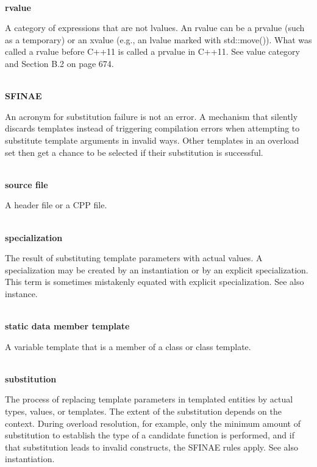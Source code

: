 \hspace*{\fill} \\ %
\noindent
\textbf{rvalue}

A category of expressions that are not lvalues. An rvalue can be a prvalue (such as a temporary) or an xvalue (e.g., an lvalue marked with std::move()). What was called a rvalue before C++11 is called a prvalue in C++11. See value category and Section B.2 on page 674.

\hspace*{\fill} \\ %
\noindent
\textbf{SFINAE}

An acronym for substitution failure is not an error. A mechanism that silently discards templates instead of triggering compilation errors when attempting to substitute template arguments in invalid ways. Other templates in an overload set then get a chance to be selected if their substitution is successful.

\hspace*{\fill} \\ %
\noindent
\textbf{source file}

A header file or a CPP file.

\hspace*{\fill} \\ %
\noindent
\textbf{specialization}

The result of substituting template parameters with actual values. A specialization may be created by an instantiation or by an explicit specialization. This term is sometimes mistakenly equated with explicit specialization. See also instance.

\hspace*{\fill} \\ %
\noindent
\textbf{static data member template}

A variable template that is a member of a class or class template.

\hspace*{\fill} \\ %
\noindent
\textbf{substitution}

The process of replacing template parameters in templated entities by actual types, values, or templates. The extent of the substitution depends on the context. During overload resolution, for example, only the minimum amount of substitution to establish the type of a candidate function is performed, and if that substitution leads to invalid constructs, the SFINAE rules apply. See also instantiation.

